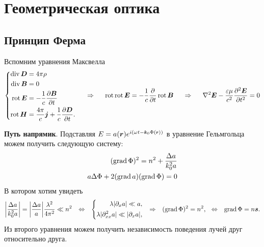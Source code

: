 \section{Геометрическая оптика}

\subsection{Принцип Ферма}

Вспомним уравнения Максвелла
\begin{equation*}
    \left\{\begin{aligned}
            \mathop{\mathrm{div}}\nolimits \mbox{\boldmath $D$} &= 4 \pi \rho \\
            \mathop{\mathrm{div}}\nolimits \mbox{\boldmath $B$} &= 0 \\
            \mathop{\mathrm{rot}}\nolimits \mbox{\boldmath $E$} &= - \frac{1}{c}\frac{\partial \mbox{\boldmath $B$}}{\partial t} \\
            \mathop{\mathrm{rot}}\nolimits \mbox{\boldmath $H$} &= \frac{4\pi}{c} \mbox{\boldmath $j$} + \frac{1}{c} \frac{\partial \mbox{\boldmath $D$}}{\partial t}.
    \end{aligned}\right.
    \hspace{0.5cm} \Rightarrow \hspace{0.5cm}
    \mathop{\mathrm{rot}}\nolimits \mathop{\mathrm{rot}}\nolimits \mbox{\boldmath $E$} = - \frac{1}{c} \frac{\partial }{\partial t} \mathop{\mathrm{rot}}\nolimits \mbox{\boldmath $B$}
    \hspace{0.5cm} \Rightarrow \hspace{0.5cm}
    \nabla^2 \mbox{\boldmath $E$} - \frac{\varepsilon \mu}{c^2} \frac{\partial^2 \mbox{\boldmath $E$}}{\partial t^2} = 0
\end{equation*}

\textbf{Путь напрямик}.
Подставляя $E = a(\vc{r}) e^{i(\omega t - \smallvc{k}_0 \Phi(\smallvc{r}))}$ в уравнение Гельмгольца можем получить следующую систему:
\begin{align*}
    (\mathop{\mathrm{grad}}\nolimits \Phi)^2 = n^2 + \frac{\Delta a}{k_0^2 a} \\
    a \Delta \Phi + 2 (\mathop{\mathrm{grad}}\nolimits a) (\mathop{\mathrm{grad}}\nolimits \Phi) = 0
\end{align*}
В котором хотим увидеть
\begin{equation*}
    \bigg| \frac{\Delta a}{k_0^2 a} \bigg| = \bigg| \frac{\Delta a}{a} \bigg| \frac{\lambda^2}{4 \pi^2} \ll n^2 
    \hspace{2.5 mm} \Leftrightarrow \hspace{2.5 mm} 
    \left\{\begin{aligned}
        \lambda |\partial_x a| \ll a, \\
        \lambda |\partial_{xx}^2 a| \ll |\partial_x a|,
    \end{aligned}\right.
\hspace{2.5 mm} \Rightarrow \hspace{2.5 mm}
(\mathop{\mathrm{grad}}\nolimits \Phi)^2 = n^2,
\hspace{2.5 mm} \Leftrightarrow \hspace{2.5 mm} 
\mathop{\mathrm{grad}}\nolimits \Phi = n \mbox{\boldmath $s$}.
\end{equation*}
Из второго уравнения можем получить независимость поведения лучей друг относительно друга. 


